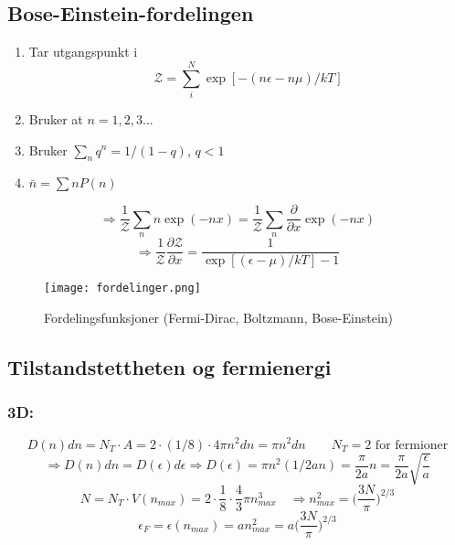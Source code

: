 \documentclass{article}
\begin{document}
\begin{multicols}{2}
\subsection*{Bose-Einstein-fordelingen}
\begin{enumerate}
\item Tar utgangspunkt i $$\mathcal{Z}=\sum_i^N\exp[-(n\epsilon-n\mu)/kT]$$
\item Bruker at $n=1,2,3...$
\item Bruker $\sum_nq^n=1/(1-q),\, q<1$
\item $\bar{n}=\sum nP(n)$
\end{enumerate}
$$\Rightarrow \frac{1}{\mathcal{Z}}\sum_n n\exp(-nx)=\frac{1}{\mathcal{Z}}\sum_n\frac{\partial}{\partial x}\exp(-nx)$$
$$\Rightarrow \frac{1}{\mathcal{Z}}\frac{\partial\mathcal{Z}}{\partial x}=\frac{1}{\exp[(\epsilon-\mu)/kT]-1}$$
\end{multicols}

\begin{figure}%
    \centering
    \qquad
\end{figure}

\begin{figure}[h]
\centering
\texttt{[image: fordelinger.png]}
\caption{Fordelingsfunksjoner (Fermi-Dirac, Boltzmann, Bose-Einstein)}
\end{figure}
\subsection*{Tilstandstettheten og fermienergi}
\subsubsection*{3D:}
$$D(n)dn=N_T\cdot A=2\cdot (1/8)\cdot 4\pi n^2dn=\pi n^2dn\qquad N_T=2\text{ for fermioner}$$
$$\Rightarrow D(n)dn=D(\epsilon)d\epsilon\Rightarrow D(\epsilon)=\pi n^2(1/2an)=\frac{\pi}{2a}n=\frac{\pi}{2a}\sqrt{\frac{\epsilon}{a}}$$
$$N=N_T\cdot V(n_{max})=2\cdot\frac{1}{8}\cdot\frac{4}{3}\pi n_{max}^3\quad\Rightarrow n_{max}^2=\bigg(\frac{3N}{\pi}\bigg)^{2/3}$$
$$\epsilon_F=\epsilon(n_{max})=an_{max}^2=a\bigg(\frac{3N}{\pi}\bigg)^{2/3}$$ 
\end{document}

